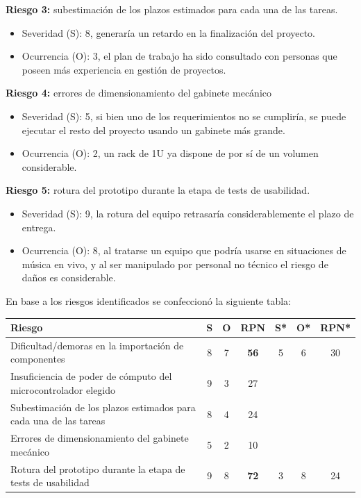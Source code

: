 \documentclass[
11pt, %
]{charter}
\begin{document}
\textbf{Riesgo 3:} subestimación de los plazos estimados para cada una de las tareas.
\begin{itemize}
	\item Severidad (S): 8, generaría un retardo en la finalización del proyecto.
	\item Ocurrencia (O): 3, el plan de trabajo ha sido consultado con personas que poseen más experiencia en gestión de proyectos. 
\end{itemize}

\textbf{Riesgo 4:} errores de dimensionamiento del gabinete mecánico
\begin{itemize}
	\item Severidad (S): 5, si bien uno de los requerimientos no se cumpliría, se puede ejecutar el resto del proyecto usando un gabinete más grande.
	\item Ocurrencia (O): 2, un rack de 1U ya dispone de por sí de un volumen considerable. 
\end{itemize}

\textbf{Riesgo 5:} rotura del prototipo durante la etapa de tests de usabilidad.
\begin{itemize}
	\item Severidad (S): 9, la rotura del equipo retrasaría considerablemente el plazo de entrega.
	\item Ocurrencia (O): 8, al tratarse un equipo que podría usarse en situaciones de música en vivo, y al ser manipulado por personal no técnico el riesgo de daños es considerable. 
\end{itemize}

En base a los riesgos identificados se confeccionó la siguiente tabla:

\begin{table}[htpb]
	\centering
	\begin{tabularx}{\linewidth}{@{}|X|c|c|c|c|c|c|@{}}
		\hline
		\rowcolor[HTML]{C0C0C0} 
		Riesgo & S & O & RPN & S* & O* & RPN* \\ \hline
		\rowcolor[HTML]{FFCCC9} Dificultad/demoras en la importación de componentes & 8 & 7 & {\color[HTML]{FE0000} \textbf{56}} & 5 & 6 & 30 \\ \hline
		Insuficiencia de poder de cómputo del microcontrolador elegido & 9 & 3 & 27 &    &    &      \\ \hline
		Subestimación de los plazos estimados para cada una de las tareas & 8 & 4 & 24 &    &    &      \\ \hline
		Errores de dimensionamiento del gabinete mecánico & 5 & 2 & 10 &    &    &      \\ \hline
		\rowcolor[HTML]{FFCCC9} Rotura del prototipo durante la etapa de tests de usabilidad & 9 & 8 & {\color[HTML]{FE0000} \textbf{72}} & 3 & 8 & 24 \\ \hline
	\end{tabularx}%
\end{table}
\end{document}
